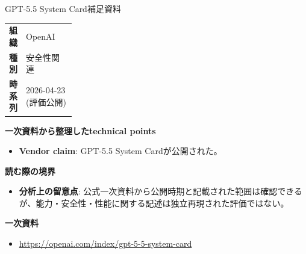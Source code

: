 \begin{technicalnote}{GPT-5.5 System Card}{補足資料}
\begingroup
\begin{tabularx}{\linewidth}{@{}>{\bfseries}p{0.22\linewidth}X@{}}
組織 & OpenAI \\
種別 & 安全性関連 \\
時系列 & 2026-04-23 (評価公開) \\
\end{tabularx}
\smallskip
{\bfseries 一次資料から整理したtechnical points}
\begin{itemize}[leftmargin=1.5em,itemsep=0.35em]
\item \textbf{Vendor claim}: GPT-5.5 System Cardが公開された。
\end{itemize}
{\bfseries 読む際の境界}
\begin{itemize}[leftmargin=1.5em,itemsep=0.35em]
\item \textbf{分析上の留意点}: 公式一次資料から公開時期と記載された範囲は確認できるが、能力・安全性・性能に関する記述は独立再現された評価ではない。
\end{itemize}
\begin{samepage}
{\bfseries 一次資料}
\begingroup\sloppy
\begin{itemize}[leftmargin=1.5em,itemsep=0.25em]
\item {\scriptsize\url{https://openai.com/index/gpt-5-5-system-card}}
\end{itemize}
\endgroup
\end{samepage}
\endgroup
\end{technicalnote}
\medskip

